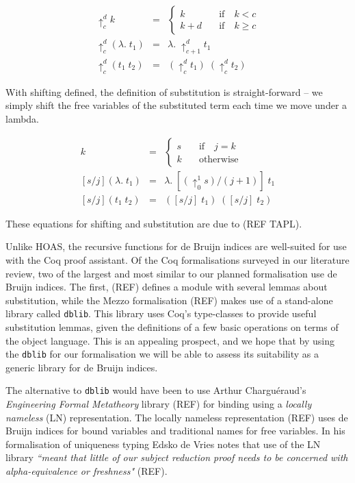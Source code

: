 \documentclass[]{unswthesis}
\newcommand{\SSPHS}{\text{SSPHS }}
\begin{document}
\begin{eqnarray*}
\uparrow^d_c k & = &
	\begin{cases}
	k \quad & \text{if} \quad k < c \\
	k + d \quad & \text{if} \quad k \geq c
	\end{cases}\\
\uparrow^d_c (\lambda. \; t_1) & = & \lambda. \; \uparrow^d_{c + 1} t_1\\
\uparrow^d_c (t_1 \; t_2) & = & (\uparrow^d_c t_1) \; (\uparrow^d_c t_2)
\end{eqnarray*}

With shifting defined, the definition of substitution is straight-forward -- we simply shift the free variables of the substituted term each time we move under a lambda.

\begin{eqnarray*}
[s/j]k & = &
	\begin{cases}
	s \quad & \text{if} \quad j = k \\
	k \quad & \text{otherwise}
	\end{cases}\\
\left[s/j\right](\lambda. \; t_1) & = & \lambda. \; [(\uparrow^1_0 s)/(j + 1)] \; t_1\\
\left[s/j\right](t_1 \; t_2) & = & ([s/j] \; t_1) \; ([s/j] \; t_2)
\end{eqnarray*}

These equations for shifting and substitution are due to (REF TAPL).

Unlike HOAS, the recursive functions for de Bruijn indices are well-suited for use with the Coq proof assistant. Of the Coq formalisations surveyed in our literature review, two of the largest and most similar to our planned formalisation use de Bruijn indices. The first, \SSPHS (REF) defines a module with several lemmas about substitution, while the Mezzo formalisation (REF) makes use of a stand-alone library called \texttt{dblib}. This library uses Coq's type-classes to provide useful substitution lemmas, given the definitions of a few basic operations on terms of the object language. This is an appealing prospect, and we hope that by using the \texttt{dblib} for our formalisation we will be able to assess its suitability as a generic library for de Bruijn indices.

The alternative to \texttt{dblib} would have been to use Arthur Chargu\'{e}raud's \textit{Engineering Formal Metatheory} library (REF) for binding using a \textit{locally nameless} (LN) representation. The locally nameless representation (REF) uses de Bruijn indices for bound variables and traditional names for free variables. In his formalisation of uniqueness typing Edsko de Vries notes that use of the LN library \textit{``meant that little of our subject reduction proof needs to be concerned with alpha-equivalence or freshness"} (REF).
\end{document}
